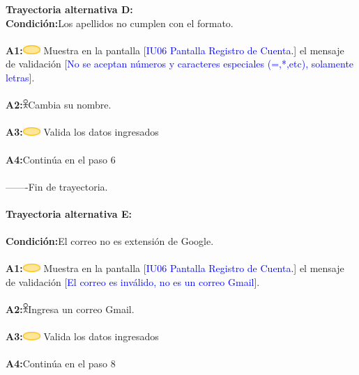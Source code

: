                    \textbf{Trayectoria alternativa D:}\\
                        \textbf{Condición:}Los apellidos no cumplen con el formato.\\\\
                        \textbf{A1:}\includegraphics[width=0.0500\textwidth]{Figuras/sistema.png} Muestra en la pantalla [\textcolor{blue}{IU06 Pantalla Registro de Cuenta}.] el mensaje de validación [\textcolor{blue}{No se aceptan números y caracteres especiales (=,*,etc), solamente letras}].  \\\\
                        \textbf{A2:}\includegraphics[width=0.0150\textwidth]{Figuras/persona.png}Cambia su nombre.\\\\
                        \textbf{A3:}\includegraphics[width=0.0500\textwidth]{Figuras/sistema.png} Valida los datos ingresados\\\\  
                        \textbf{A4:}Continúa en el paso 6 \\\\
       
        -------Fin de  trayectoria. \\\\

                    \textbf{Trayectoria alternativa E:}\\\\
                        \textbf{Condición:}El correo no es extensión de Google.\\\\
                        \textbf{A1:}\includegraphics[width=0.0500\textwidth]{Figuras/sistema.png} Muestra en la pantalla [\textcolor{blue}{IU06 Pantalla Registro de Cuenta}.] el mensaje de validación [\textcolor{blue}{El correo es inválido, no es un correo Gmail}].  \\\\  
                        \textbf{A2:}\includegraphics[width=0.0150\textwidth]{Figuras/persona.png}Ingresa un correo Gmail.\\\\
                        \textbf{A3:}\includegraphics[width=0.0500\textwidth]{Figuras/sistema.png} Valida los datos ingresados\\\\
                        \textbf{A4:}Continúa en el paso 8 \\\\
       
